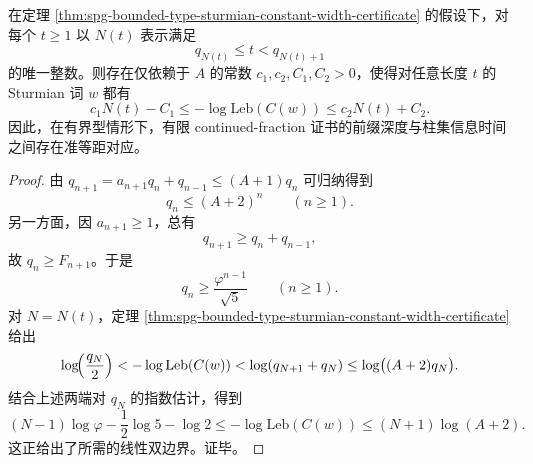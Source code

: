 \begin{theorem}[有界型情形下证书深度与信息时间的准等距律]\label{thm:spg-sturmian-certificate-depth-information-time-quasi-isometry}
在定理 \ref{thm:spg-bounded-type-sturmian-constant-width-certificate} 的假设下，对每个 \(t\ge 1\) 以 \(N(t)\) 表示满足
\[
q_{N(t)}\le t<q_{N(t)+1}
\]
的唯一整数。则存在仅依赖于 \(A\) 的常数 \(c_1,c_2,C_1,C_2>0\)，使得对任意长度 \(t\) 的 Sturmian 词 \(w\) 都有
\[
c_1N(t)-C_1
\le
-\log \mathrm{Leb}(C(w))
\le
c_2N(t)+C_2.
\]
因此，在有界型情形下，有限 continued-fraction 证书的前缀深度与柱集信息时间之间存在准等距对应。
\end{theorem}
\begin{proof}
由 \(q_{n+1}=a_{n+1}q_n+q_{n-1}\le (A+1)q_n\) 可归纳得到
\[
q_n\le (A+2)^n
\qquad(n\ge 1).
\]
另一方面，因 \(a_{n+1}\ge 1\)，总有
\[
q_{n+1}\ge q_n+q_{n-1},
\]
故 \(q_n\ge F_{n+1}\)。于是
\[
q_n\ge \frac{\varphi^{n-1}}{\sqrt5}
\qquad(n\ge 1).
\]
对 \(N=N(t)\)，定理 \ref{thm:spg-bounded-type-sturmian-constant-width-certificate} 给出
\[
\log\!\Bigl(\frac{q_N}{2}\Bigr)
<
-\log \mathrm{Leb}(C(w))
<
\log(q_{N+1}+q_N)
\le
\log\bigl((A+2)q_N\bigr).
\]
结合上述两端对 \(q_N\) 的指数估计，得到
\[
(N-1)\log\varphi-\frac12\log 5-\log 2
\le
-\log \mathrm{Leb}(C(w))
\le
(N+1)\log(A+2).
\]
这正给出了所需的线性双边界。证毕。
\end{proof}

\endinput
